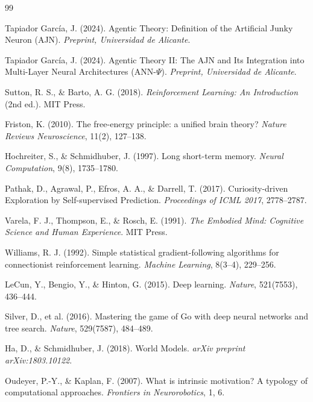 \documentclass[12pt,a4paper]{article}
\begin{document}
\begin{thebibliography}{99}

Tapiador García, J. (2024).
Agentic Theory: Definition of the Artificial Junky Neuron (AJN).
\textit{Preprint, Universidad de Alicante}.

Tapiador García, J. (2024).
Agentic Theory II: The AJN and Its Integration into Multi-Layer Neural Architectures
(ANN-$\Psi$).
\textit{Preprint, Universidad de Alicante}.

Sutton, R. S., \& Barto, A. G. (2018).
\textit{Reinforcement Learning: An Introduction} (2nd ed.).
MIT Press.

Friston, K. (2010).
The free-energy principle: a unified brain theory?
\textit{Nature Reviews Neuroscience}, 11(2), 127--138.

Hochreiter, S., \& Schmidhuber, J. (1997).
Long short-term memory.
\textit{Neural Computation}, 9(8), 1735--1780.

Pathak, D., Agrawal, P., Efros, A. A., \& Darrell, T. (2017).
Curiosity-driven Exploration by Self-supervised Prediction.
\textit{Proceedings of ICML 2017}, 2778--2787.

Varela, F. J., Thompson, E., \& Rosch, E. (1991).
\textit{The Embodied Mind: Cognitive Science and Human Experience}.
MIT Press.

Williams, R. J. (1992).
Simple statistical gradient-following algorithms for connectionist reinforcement
learning.
\textit{Machine Learning}, 8(3--4), 229--256.

LeCun, Y., Bengio, Y., \& Hinton, G. (2015).
Deep learning.
\textit{Nature}, 521(7553), 436--444.

Silver, D., et al. (2016).
Mastering the game of Go with deep neural networks and tree search.
\textit{Nature}, 529(7587), 484--489.

Ha, D., \& Schmidhuber, J. (2018).
World Models.
\textit{arXiv preprint arXiv:1803.10122}.

Oudeyer, P.-Y., \& Kaplan, F. (2007).
What is intrinsic motivation? A typology of computational approaches.
\textit{Frontiers in Neurorobotics}, 1, 6.

\end{thebibliography}
\end{document}
